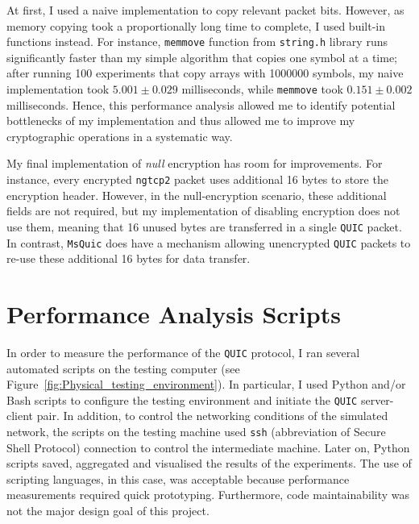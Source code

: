 \documentclass[12pt,a4paper,twoside,openright]{report}
\begin{document}
At first, I used a naive implementation to copy relevant packet bits.
However, as memory copying took a proportionally long time to complete, I used built-in functions instead.
For instance, \texttt{memmove} function from \texttt{string.h} library runs significantly faster than my simple algorithm that copies one symbol at a time; after running 100 experiments that copy arrays with 1000000 symbols, my naive implementation took $5.001 \pm 0.029$ milliseconds, while \texttt{memmove} took $0.151 \pm 0.002$ milliseconds.
Hence, this performance analysis allowed me to identify potential bottlenecks of my implementation and thus allowed me to improve my cryptographic operations in a systematic way.





My final implementation of \textit{null} encryption has room for improvements.
For instance, every encrypted \texttt{ngtcp2} packet uses additional 16 bytes to store the encryption header.
However, in the null-encryption scenario, these additional fields are not required, but my implementation of disabling encryption does not use them, meaning that 16 unused bytes are transferred in a single \texttt{QUIC} packet.
In contrast, \texttt{MsQuic} does have a mechanism allowing unencrypted \texttt{QUIC} packets to re-use these additional 16 bytes for data transfer.



\section{Performance Analysis Scripts}

In order to measure the performance of the \texttt{QUIC} protocol, I ran several automated scripts on the testing computer (see Figure~\ref{fig:Physical_testing_environment}).
In particular, I used Python and/or Bash scripts to configure the testing environment and initiate the \texttt{QUIC} server-client pair.
In addition, to control the networking conditions of the simulated network, the scripts on the testing machine used \texttt{ssh} (abbreviation of Secure Shell Protocol) connection to control the intermediate machine.
Later on, Python scripts saved, aggregated and visualised the results of the experiments.
The use of scripting languages, in this case, was acceptable because performance measurements required quick prototyping.
Furthermore, code maintainability was not the major design goal of this project.
\end{document}
